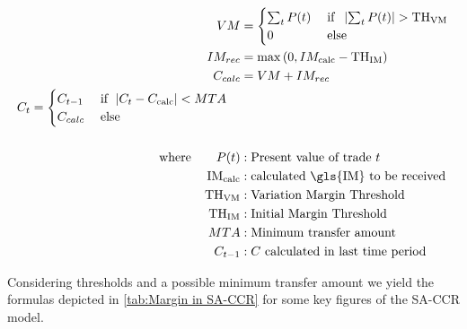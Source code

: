 \documentclass[../Thesis_AHoecherl.tex]{subfiles}
\begin{document}
\begin{align}
		VM &= \begin{cases}
			\sum_t{P(t)} \; & \text{if } \; \left|\sum_t{P(t)}\right| > \text{TH\textsubscript{VM}} \\
			0 & \text{else}
		\end{cases}\nonumber \\
	IM_{rec} &= \max{(0, IM_{\text{calc}}-\text{TH\textsubscript{IM}})} \nonumber \\
	C_{calc} &= VM + IM_{rec} \nonumber \\
	\begin{split}
		C_t &= \begin{cases}
			C_{t-1} & \text{if } \; |C_t-C_{\text{calc}}| < MTA\\
			C_{calc} \; &\text{else} 
		\end{cases}\label{eq:C}
	\end{split}\\
	\nonumber \\
	\text{where} \qquad P(t) &: \text{Present value of trade $t$} \nonumber \\
	\text{IM\textsubscript{calc}} &: \text{calculated \gls{IM} to be received } \nonumber \\
	\text{TH\textsubscript{VM}} &: \text{Variation Margin Threshold} \nonumber \\
	\text{TH\textsubscript{IM}} &: \text{Initial Margin Threshold} \nonumber \\
	MTA &: \text{Minimum transfer amount} \nonumber \\
	C_{t-1} &: \text{$C$ calculated in last time period} \nonumber
\end{align}

Considering thresholds and a possible minimum transfer amount we yield the formulas depicted in \ref{tab:Margin in SA-CCR} for some key figures of the \gls{SA-CCR} model.
\end{document}
